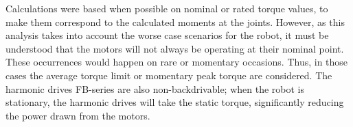 Calculations were based when possible on nominal or rated torque values, to make them correspond to the calculated moments at the joints. However, as this analysis takes into account the worse case scenarios for the robot, it must be understood that the motors will not always be operating at their nominal point. These occurrences would happen on rare or momentary occasions. Thus, in those cases the average torque limit or momentary peak torque are considered.
The harmonic drives FB-series are also non-backdrivable; when the robot is stationary, the harmonic drives will take the static torque, significantly reducing the power drawn from the motors.
